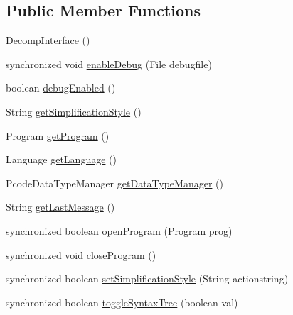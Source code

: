\subsection*{Public Member Functions}
\begin{DoxyCompactItemize}
\item 
\mbox{\hyperlink{classghidra_1_1app_1_1decompiler_1_1_decomp_interface_a8718a4830e01b22a87062178f37cba19}{Decomp\+Interface}} ()
\item 
synchronized void \mbox{\hyperlink{classghidra_1_1app_1_1decompiler_1_1_decomp_interface_a255a0680986c6d2c7bd0c674f56f9124}{enable\+Debug}} (File debugfile)
\item 
boolean \mbox{\hyperlink{classghidra_1_1app_1_1decompiler_1_1_decomp_interface_a634a9d0bbfd1fe75112f662aada77210}{debug\+Enabled}} ()
\item 
String \mbox{\hyperlink{classghidra_1_1app_1_1decompiler_1_1_decomp_interface_a48e34641720039c672e1ea1ad3284e67}{get\+Simplification\+Style}} ()
\item 
Program \mbox{\hyperlink{classghidra_1_1app_1_1decompiler_1_1_decomp_interface_a63b31332733fec7ab8cb2b87669203bc}{get\+Program}} ()
\item 
Language \mbox{\hyperlink{classghidra_1_1app_1_1decompiler_1_1_decomp_interface_a7ed2bb195a7664d9be736016d0daa19d}{get\+Language}} ()
\item 
Pcode\+Data\+Type\+Manager \mbox{\hyperlink{classghidra_1_1app_1_1decompiler_1_1_decomp_interface_ab3fcaca7d6965b145c3d4b6041df2d05}{get\+Data\+Type\+Manager}} ()
\item 
String \mbox{\hyperlink{classghidra_1_1app_1_1decompiler_1_1_decomp_interface_ac555389aec521f55bc520206d9a735be}{get\+Last\+Message}} ()
\item 
synchronized boolean \mbox{\hyperlink{classghidra_1_1app_1_1decompiler_1_1_decomp_interface_a94b9fdc33332c1a8f1af70a2957408a6}{open\+Program}} (Program prog)
\item 
synchronized void \mbox{\hyperlink{classghidra_1_1app_1_1decompiler_1_1_decomp_interface_a3211ce7c55abceb8d2a9beba104ebbe6}{close\+Program}} ()
\item 
synchronized boolean \mbox{\hyperlink{classghidra_1_1app_1_1decompiler_1_1_decomp_interface_a6f21c198b5a43c80122198470b0310a8}{set\+Simplification\+Style}} (String actionstring)
\item 
synchronized boolean \mbox{\hyperlink{classghidra_1_1app_1_1decompiler_1_1_decomp_interface_ae7b7293b0cbec7e9c71cbbe6f3c8104e}{toggle\+Syntax\+Tree}} (boolean val)

\end{DoxyCompactItemize}
